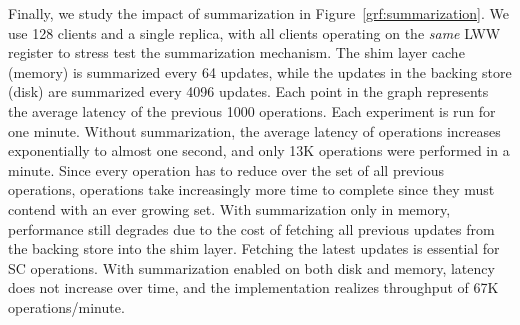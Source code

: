 Finally, we study the impact of summarization in
Figure~\ref{grf:summarization}. We use 128 clients and a single \name
replica, with all clients operating on the \emph{same} LWW register to
stress test the summarization mechanism. The shim layer cache (memory) is
summarized every 64 updates, while the updates in the backing store (disk)
are summarized every 4096 updates. Each point in the graph represents the
average latency of the previous 1000 operations. Each experiment is run for
one minute.  Without summarization, the average latency of operations
increases exponentially to almost one second, and only 13K operations were
performed in a minute. Since every operation has to reduce over the set of
all previous operations, operations take increasingly more time to complete
since they must contend with an ever growing set.  With summarization only
in memory, performance still degrades due to the cost of fetching all
previous updates from the backing store into the shim layer. Fetching the
latest updates is essential for SC operations. With summarization enabled on
both disk and memory, latency does not increase over time, and the
implementation realizes throughput of 67K operations/minute. 
